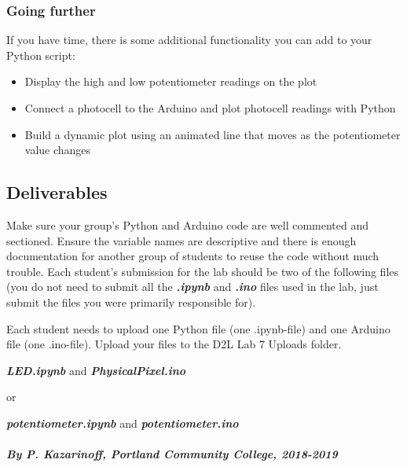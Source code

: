 \documentclass[11pt]{article}
\begin{document}
    \hypertarget{going-further}{%
\subsubsection{Going further}\label{going-further}}

If you have time, there is some additional functionality you can add to
your Python script:

\begin{itemize}
\item
  Display the high and low potentiometer readings on the plot
\item
  Connect a photocell to the Arduino and plot photocell readings with
  Python
\item
  Build a dynamic plot using an animated line that moves as the
  potentiometer value changes
\end{itemize}

    \hypertarget{deliverables}{%
\subsection{Deliverables}\label{deliverables}}

Make sure your group's Python and Arduino code are well commented and
sectioned. Ensure the variable names are descriptive and there is enough
documentation for another group of students to reuse the code without
much trouble. Each student's submission for the lab should be two of the
following files (you do not need to submit all the
\textbf{\emph{.ipynb}} and \textbf{\emph{.ino}} files used in the lab,
just submit the files you were primarily responsible for).

Each student needs to upload one Python file (one .ipynb-file) and one
Arduino file (one .ino-file). Upload your files to the D2L Lab 7 Uploads
folder.

\textbf{\emph{LED.ipynb}} and \textbf{\emph{PhysicalPixel.ino}}

or

\textbf{\emph{potentiometer.ipynb}} and
\textbf{\emph{potentiometer.ino}}

    \hypertarget{by-p.-kazarinoff-portland-community-college-2018-2019}{%
\paragraph{\texorpdfstring{\emph{By P. Kazarinoff, Portland Community
College,
2018-2019}}{By P. Kazarinoff, Portland Community College, 2018-2019}}\label{by-p.-kazarinoff-portland-community-college-2018-2019}}


    
    
    
\end{document}
